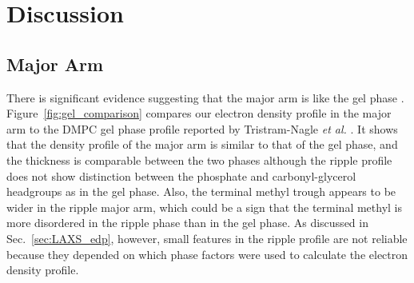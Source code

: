 \newpage
\section{Discussion}\label{sec:ripple_discussion}
\subsection{Major Arm}
There is significant evidence suggesting that the major arm is like 
the gel phase \cite{ref:Tardieu73,ref:Schneider83,ref:Sun96,ref:Riske09}. 
Figure~\ref{fig:gel_comparison} compares our electron density
profile in the major arm to the DMPC gel phase profile reported by 
Tristram-Nagle \textit{et al.} \cite{Tristram-Nagle02}. 
It shows that the density profile of the major arm is similar to that 
of the gel phase, and the thickness is comparable between the two phases
although the ripple profile does not show distinction
between the phosphate and carbonyl-glycerol headgroups as in the gel phase.
Also, the terminal methyl trough appears to be wider in the ripple major arm,
which could be a sign that the terminal methyl is more disordered
in the ripple phase than in the gel phase.
As discussed in
Sec.~\ref{sec:LAXS_edp}, however, small features in the ripple profile are not
reliable because they depended on which phase factors were used
to calculate the electron density profile.

